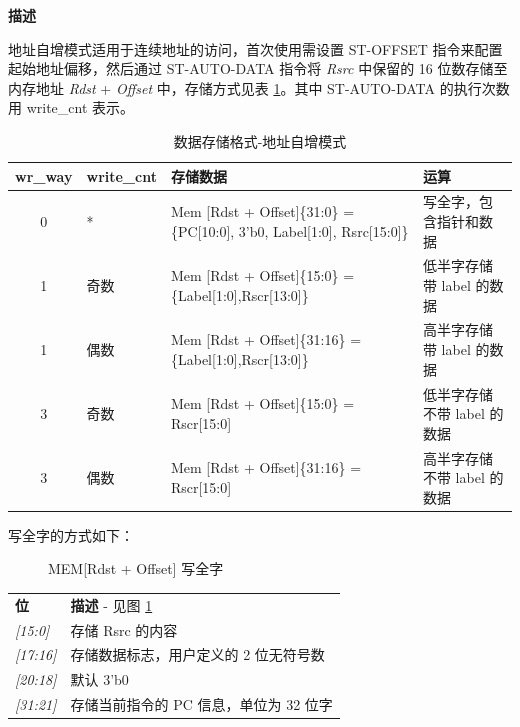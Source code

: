 \documentclass[main\_\_CN.tex]{subfiles}
\begin{document}
\textbf{描述}

地址自增模式适用于连续地址的访问，首次使用需设置 ST-OFFSET 指令来配置起始地址偏移，然后通过 ST-AUTO-DATA 指令将 \textit{Rsrc} 中保留的 16 位数存储至内存地址 \textit{Rdst} + \textit{Offset} 中，存储方式见表 \ref{table:data_format-with-write_way-auto}。其中 ST-AUTO-DATA 的执行次数用 write\_cnt 表示。 \\


\begin{table}[!ht]
    \centering
    \begin{tabular}{ c l l l }
    \textbf{wr\_way}  & \textbf{write\_cnt} & \textbf{存储数据} & \textbf{运算}  \\ \hline
    0 &*&Mem [Rdst + Offset]\{31:0\} =\{PC[10:0], 3'b0, Label[1:0], Rsrc[15:0]\}  & 写全字，包含指针和数据 \\
    1 & 奇数 & Mem [Rdst + Offset]\{15:0\}  = \{Label[1:0],Rscr[13:0]\}& 低半字存储带 label 的数据\\
    1 & 偶数 & Mem [Rdst + Offset]\{31:16\} = \{Label[1:0],Rscr[13:0]\}& 高半字存储带 label 的数据\\
    3 & 奇数 & Mem [Rdst + Offset]\{15:0\}  = Rscr[15:0]& 低半字存储不带 label 的数据  \\
    3 & 偶数 & Mem [Rdst + Offset]\{31:16\} = Rscr[15:0]& 高半字存储不带 label 的数据  \\
    \end{tabular}
    \caption{数据存储格式-地址自增模式}
    \label{table:data_format-with-write_way-auto}
\end{table}

写全字的方式如下：

%
%
%
%
\begin{figure}[!ht ]
    \centering
    \caption{MEM[Rdst + Offset] 写全字}
    \label{figure:RTCMEM}
\end{figure}

\vspace{-2em}
\begin{tabular}{ l l }
\textbf{位} & \textbf{描述} - 见图 \ref{figure:RTCMEM} \\
\textit{[15:0] } & 存储 Rsrc 的内容\\
\textit{[17:16] } & 存储数据标志，用户定义的 2 位无符号数\\
\textit{[20:18]} & 默认 3'b0 \\
\textit{[31:21]} & 存储当前指令的 PC 信息，单位为 32 位字\\
\end{tabular}
\end{document}
